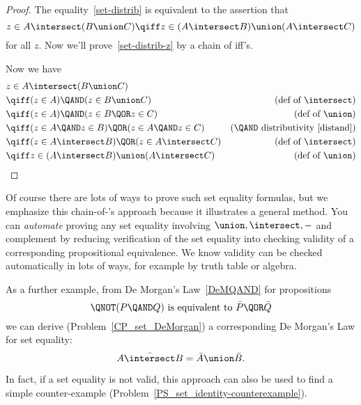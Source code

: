 \begin{proof}
The equality~\eqref{set-distrib} is equivalent to the assertion that
\begin{equation}\label{set-distrib-z}
  z \in A \intersect (B \union C) \qiff z \in (A \intersect B)
  \union (A \intersect C)
\end{equation}
for all $z$.  Now we'll prove~\eqref{set-distrib-z} by a chain of iff's.

Now we have
\begin{align*}
\lefteqn{z \in A \intersect (B \union C)}\\
& \qiff (z \in A) \QAND (z \in B \union C) & \text{(def of $\intersect$)}\\
& \qiff (z \in A) \QAND (z \in B \QOR z \in C)
                & \text{(def of $\union$)}\\
& \qiff (z \in A \QAND z \in B) \QOR (z \in A \QAND z \in C)
                & \text{(\QAND\ distributivity~\eqref{distand})}\\
& \qiff (z \in A \intersect B) \QOR (z \in A \intersect C)
                & \text{(def of $\intersect$)}\\
& \qiff z \in (A \intersect B) \union (A \intersect C)
                & \text{(def of $\union$)}
\end{align*}

\end{proof}
  
Of course there are lots of ways to prove such set equality formulas,
but we emphasize this chain-of-\QIFF's approach because it illustrates
a general method.  You can \emph{automate} proving any set equality
involving $\union, \intersect, -$ and complement by reducing
verification of the set equality into checking validity of a
corresponding propositional equivalence.  We know validity can be
checked automatically in lots of ways, for example by truth table or
algebra.

As a further example, from De Morgan's Law~\eqref{DeMQAND} for
propositions
\[
\QNOT(P \QAND Q)  \text{  is equivalent to  } \bar{P} \QOR \bar{Q}
\]
we can derive (Problem~\ref{CP_set_DeMorgan}) a corresponding De
Morgan's Law for set equality:
\begin{equation}\label{set-demorgan}
\bar{A \intersect B} = \bar{A} \union \bar{B}.
\end{equation}

In fact, if a set equality is not valid, this approach can also be
used to find a simple counter-example
(Problem~\ref{PS_set_identity-counterexample}).

